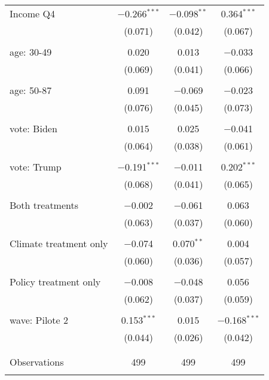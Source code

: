 \begin{tabular}{@{\extracolsep{5pt}}lccc}
 Income Q4 & $-$0.266$^{***}$ & $-$0.098$^{**}$ & 0.364$^{***}$ \\ 
  & (0.071) & (0.042) & (0.067) \\ 
  & & & \\ 
 age: 30-49 & 0.020 & 0.013 & $-$0.033 \\ 
  & (0.069) & (0.041) & (0.066) \\ 
  & & & \\ 
 age: 50-87 & 0.091 & $-$0.069 & $-$0.023 \\ 
  & (0.076) & (0.045) & (0.073) \\ 
  & & & \\ 
 vote: Biden & 0.015 & 0.025 & $-$0.041 \\ 
  & (0.064) & (0.038) & (0.061) \\ 
  & & & \\ 
 vote: Trump & $-$0.191$^{***}$ & $-$0.011 & 0.202$^{***}$ \\ 
  & (0.068) & (0.041) & (0.065) \\ 
  & & & \\ 
 Both treatments & $-$0.002 & $-$0.061 & 0.063 \\ 
  & (0.063) & (0.037) & (0.060) \\ 
  & & & \\ 
 Climate treatment only & $-$0.074 & 0.070$^{**}$ & 0.004 \\ 
  & (0.060) & (0.036) & (0.057) \\ 
  & & & \\ 
 Policy treatment only & $-$0.008 & $-$0.048 & 0.056 \\ 
  & (0.062) & (0.037) & (0.059) \\ 
  & & & \\ 
 wave: Pilote 2 & 0.153$^{***}$ & 0.015 & $-$0.168$^{***}$ \\ 
  & (0.044) & (0.026) & (0.042) \\ 
  & & & \\ 
\hline \\[-1.8ex] 

Observations & 499 & 499 & 499 \\ 
\hline 
\hline \\[-1.8ex] 
\end{tabular} 